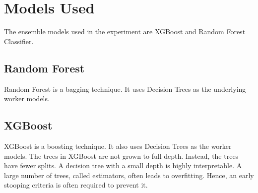 \section{Models Used}
The ensemble models used in the experiment are XGBoost and Random Forest Classifier.

\subsection{Random Forest}

Random Forest is a bagging technique. It uses Decision Trees as the underlying worker models.

\subsection{XGBoost}

XGBoost is a boosting technique. It also uses Decision Trees as the worker models. The trees in XGBoost are not grown to full depth. Instead, the trees have fewer splits. A decision tree with a small depth is highly interpretable. A large number of trees, called estimators, often leads to overfitting. Hence, an early stooping criteria is often required to prevent it.


